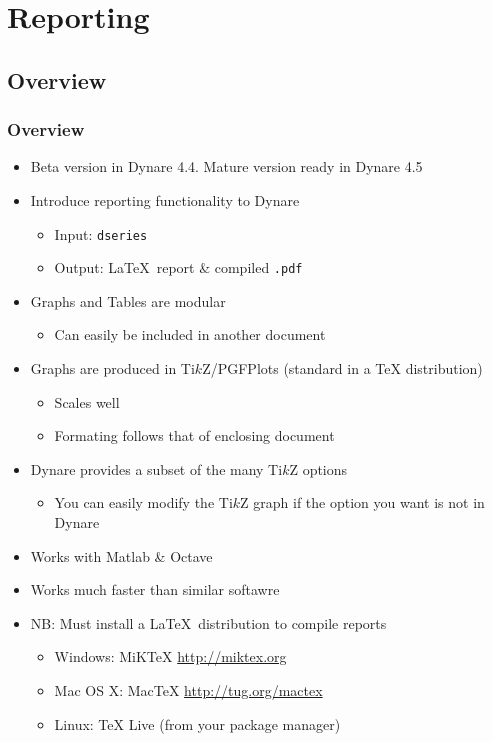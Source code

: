 \documentclass[10pt]{beamer}
\newcommand{\myitem}{\item[$\bullet$]}
\begin{document}
%
%
\section{Reporting}
\subsection{Overview}
\begin{frame}
  \frametitle{Overview}
  \begin{itemize}
  \myitem Beta version in Dynare 4.4. Mature version ready in Dynare 4.5
  \myitem Introduce reporting functionality to Dynare
      \begin{itemize}
      \myitem Input: \texttt{dseries}
      \myitem Output: \LaTeX\ report \& compiled \texttt{.pdf}
      \end{itemize}
    \myitem Graphs and Tables are modular
      \begin{itemize}
      \myitem Can easily be included in another document
      \end{itemize}
    \myitem Graphs are produced in Ti$k$Z/PGFPlots (standard in a TeX distribution)
      \begin{itemize}
      \myitem Scales well
      \myitem Formating follows that of enclosing document
      \end{itemize}
    \myitem Dynare provides a subset of the many Ti$k$Z options
      \begin{itemize}
      \myitem You can easily modify the Ti$k$Z graph if the option you want is not in Dynare
      \end{itemize}
    \myitem Works with Matlab \& Octave
    \myitem Works much faster than similar softawre
    \myitem NB: Must install a \LaTeX\ distribution to compile reports
      \begin{itemize}
      \myitem Windows: MiKTeX \url{http://miktex.org}
      \myitem Mac OS X: MacTeX \url{http://tug.org/mactex}
      \myitem Linux: TeX Live (from your package manager)
      \end{itemize}
  \end{itemize}
\end{frame}
\end{document}

